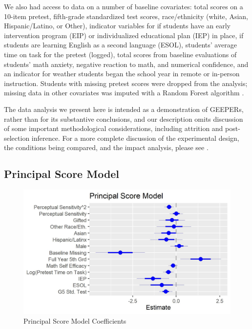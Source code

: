 \documentclass{statsoc} %
\begin{document}
We also had access to data on a number of baseline covariates: total scores on a 10-item pretest, fifth-grade standardized test scores, race/ethnicity (white, Asian, Hispanic/Latino, or Other), indicator variables for if students have an early intervention program (EIP) or individualized educational plan (IEP) in place, if students are learning English as a second language (ESOL), students' average time on task for the pretest (logged), total scores from baseline evaluations of students' math anxiety, negative reaction to math, and numerical confidence, and an indicator for weather students began the school year in remote or in-person instruction.
Students with missing pretest scores were dropped from the analysis; missing data in other covariates was imputed with a Random Forest algorithm \citep{missForest}.

The data analysis we present here is intended as a demonstration of GEEPERs, rather than for its substantive conclusions, and our description omits discussion of some important methodological considerations, including attrition and post-selection inference. For a more complete discussion of the experimental design, the conditions being compared, and the impact analysis, please see \citet{impactPaper}.

\subsection{Principal Score Model}\label{sec:psMod}

\begin{figure}
  \centering
  \includegraphics{../figure/psModCoef.jpg}
  \caption{Principal Score Model Coefficients}
  \label{fig:psMod}
\end{figure}
\end{document}
